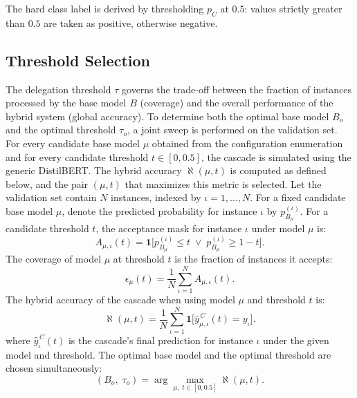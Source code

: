 \documentclass[a4paper,twoside,12pt]{book}
\newcommand{\predVal}{y}
\newcommand{\idx}{\iota}
\newcommand{\mBase}{B}
\newcommand{\mCas}{C}
\newcommand{\thresh}{\tau}
\newcommand{\numVal}{N}
\newcommand{\modelvar}{\mu}
\newcommand{\sweepthresh}{t}
\newcommand{\probSmall}[1]{p_{#1}}
\newcommand{\accMask}[3]{A_{#1,#2}(#3)}
\newcommand{\coverage}[2]{\epsilon_{#1}(#2)}
\newcommand{\hybridacc}[2]{\aleph(#1,#2)}
\newcommand{\cascadePred}[3]{\hat{\predVal}_{#1,#2}^{\,\mCas}(#3)}
\newcommand{\baseProb}[2]{\probSmall{\mBase_{\!#1}}^{(#2)}}
\newcommand{\optimal}{o}
\begin{document}
The hard class label is derived by thresholding $\probSmall{\mCas}$ at $0.5$: values strictly greater than $0.5$ are taken as positive, otherwise negative.

\subsection{Threshold Selection} \label{sec:threshold_selection}

The delegation threshold $\thresh$ governs the trade-off between the fraction of instances processed by the base model $\mBase$ (coverage) and the overall performance of the hybrid system (global accuracy). To determine both the optimal base model $\mBase_{\!\optimal}$ and the optimal threshold $\thresh_{\!\optimal}$, a joint sweep is performed on the validation set. For every candidate base model $\modelvar$ obtained from the configuration enumeration and for every candidate threshold $\sweepthresh \in [0,0.5]$, the cascade is simulated using the generic DistilBERT. The hybrid accuracy $\hybridacc{\modelvar}{\sweepthresh}$ is computed as defined below, and the pair $(\modelvar,\sweepthresh)$ that maximizes this metric is selected. Let the validation set contain $\numVal$ instances, indexed by $\idx = 1,\dots,\numVal$. For a fixed candidate base model $\modelvar$, denote the predicted probability for instance $\idx$ by $\probSmall{\mBase_{\!\modelvar}}^{(\idx)}$. For a candidate threshold $\sweepthresh$, the acceptance mask for instance $\idx$ under model $\modelvar$ is:
\begin{equation}
	\accMask{\modelvar}{\idx}{\sweepthresh} = \mathbf{1}\bigl[ \baseProb{\modelvar}{\idx} \le \sweepthresh \;\lor\; \baseProb{\modelvar}{\idx} \ge 1-\sweepthresh \bigr].
\end{equation}
The coverage of model $\modelvar$ at threshold $\sweepthresh$ is the fraction of instances it accepts:
\begin{equation}	
	\coverage{\modelvar}{\sweepthresh} = \frac{1}{\numVal}\sum_{\idx=1}^{\numVal} A_{\modelvar,\idx}(\sweepthresh).
\end{equation}
The hybrid accuracy of the cascade when using model $\mu$ and threshold $\sweepthresh$ is:
\begin{equation}
	\hybridacc{\modelvar}{\sweepthresh} = \frac{1}{\numVal}\sum_{\idx=1}^{\numVal} \mathbf{1}\bigl[ \cascadePred{\modelvar}{\idx}{\sweepthresh} = \predVal_{\idx} \bigr].
\end{equation}
where $\hat{y}_{\iota}^{\,\mCas}(\sweepthresh)$ is the cascade's final prediction for instance $\iota$ under the given model and threshold. The optimal base model and the optimal threshold are chosen simultaneously:
\begin{equation}
	(\mBase_{\!\optimal},\;\thresh_{\!\optimal}) =
	\arg\max_{\mu,\;\sweepthresh \in [0,0.5]}
	\aleph(\mu,\sweepthresh).
\end{equation}
\end{document}
